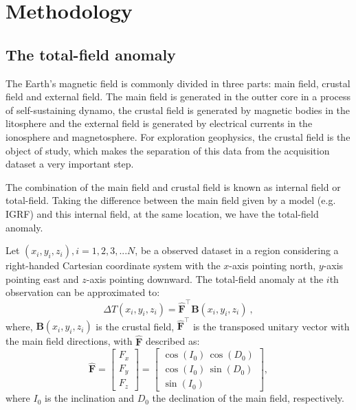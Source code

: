 \section{Methodology}

\subsection*{The total-field anomaly}

The Earth's magnetic field is commonly divided in three parts: main field, crustal field and external field. The main field is generated in the outter core in a process of self-sustaining dynamo, the crustal field is generated by magnetic bodies in the litosphere and the external field is generated by electrical currents in the ionosphere and magnetosphere. For exploration geophysics, the crustal field is the object of study, which makes the separation of this data from the acquisition dataset a very important step.

The combination of the main field and crustal field is known as internal field or total-field. Taking the difference between the main field given by a model (e.g. IGRF) and this internal field, at the same location, we have the total-field anomaly.

Let $(x_i, y_i, z_i), i =  1,2,3,...N$, be a observed dataset in a region considering a right-handed Cartesian coordinate system with the $x$-axis pointing north, $y$-axis pointing east and $z$-axis pointing downward. The total-field anomaly at the $i$th observation can be approximated to:
\begin{equation}
	\Delta T(x_i, y_i, z_i) = \hat{\mathbf{F}}^{\top} \mathbf{B}(x_i, y_i, z_i) \: ,
	\label{eq:tfanomaly}
\end{equation}
where, $\mathbf{B}(x_i, y_i, z_i)$ is the crustal field, $\hat{\mathbf{F}}^{\top}$ is the transposed unitary vector with the main field directions, with $\hat{\mathbf{F}}$ described as:
\begin{equation}
	\hat{\mathbf{F}} = \left[
	\begin{array}{c}
		F_x \\
		F_y \\
		F_z
	\end{array} \right] = 
	\left[
	\begin{array}{c}
		\cos(I_{0}) \, \cos(D_{0}) \\
		\cos(I_{0}) \, \sin(D_{0}) \\
		\sin(I_{0})
	\end{array} \right],
	\label{eq:unit_vector_F}
\end{equation}
where $I_{0}$ is the inclination and $D_{0}$ the declination of the main field, respectively.

